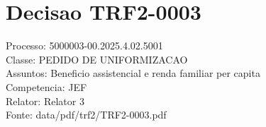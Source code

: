 \documentclass[12pt]{article}
\begin{document}
\section*{Decisao TRF2-0003}
Processo: 5000003-00.2025.4.02.5001\\
Classe: PEDIDO DE UNIFORMIZACAO\\
Assuntos: Beneficio assistencial e renda familiar per capita\\
Competencia: JEF\\
Relator: Relator 3\\
Fonte: data/pdf/trf2/TRF2-0003.pdf
\end{document}
